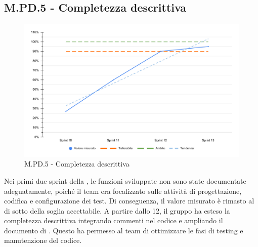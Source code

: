 \subsection{M.PD.5 - Completezza descrittiva}
 \begin{figure}[H]
    \centering
    \includegraphics[width=\textwidth]{assets/completezza_descrittiva.pdf}
    \caption{M.PD.5 - Completezza descrittiva}
\end{figure}

\par Nei primi due sprint della , le funzioni sviluppate non sono state documentate adeguatamente, poiché il team era focalizzato sulle attività di progettazione, codifica e configurazione dei test. Di conseguenza, il valore misurato è rimasto al di sotto della soglia accettabile. A partire dallo  12, il gruppo ha esteso la completezza descrittiva integrando commenti nel codice e ampliando il documento di \ST. Questo ha permesso al team di ottimizzare le fasi di testing e manutenzione del codice.